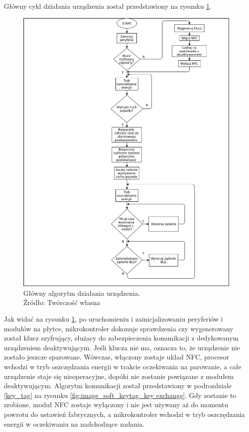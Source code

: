 Główny cykl działania urządzenia został przedstawiony na rysunku \ref{fig:image_soft_mainboard_main_alghoritm}.

\begin{figure}[H]
	\centering
	\includegraphics[width=16cm]{img/software/mainboard/Tracking_alghoritm.jpg}
	\caption{Główny algorytm działania urządzenia. 
	\\Źródło: Twórczość własna}
	\label{fig:image_soft_mainboard_main_alghoritm}
\end{figure}

Jak widać na rysunku \ref{fig:image_soft_mainboard_main_alghoritm}, po uruchomieniu i zainicjalizowaniu peryferiów i modułów na płytce, mikrokontroler dokonuje sprawdzenia czy wygenerowany został klucz szyfrujący, służacy do zabezpieczenia komunikacji z dedykowanym urządzeniem deaktywującym. Jeśli klucza nie ma, oznacza to, że urządzenie nie zostało jeszcze sparowane. Wówczas, włączony zostaje układ NFC, procesor wchodzi w tryb oszczędzania energii w trakcie oczekiwania na parowanie, a całe urządzenie staje się nieoperacyjne, dopóki nie zostanie powiązane z modułem deaktywującym. Algorytm komunikacji został przedstawiony w podrozdziale \ref{key_tag} na rysunku \ref{fig:image_soft_keytag_key exchange}. Gdy zostanie to zrobione, moduł NFC zostaje wyłączony i nie jest używany aż do momentu powrotu do ustawień fabrycznych, a mikrokontroler wchodzi w tryb oszczędzania energii w oczekiwaniu na nadchodzące zadania.

